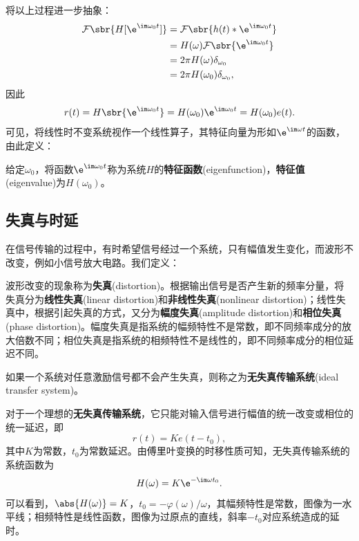 将以上过程进一步抽象：
\begin{align}
    \mathcal{F}\sbr{H[\e^{\im\omega_0 t}]}&=\mathcal{F}\sbr{h(t)*\e^{\im\omega_0 t}}\nonumber\\
    &=H(\omega)\mathcal{F}\sbr{\e^{\im\omega_0 t}}\nonumber\\
    &=2\pi H(\omega)\delta_{\omega_0}\nonumber\\
    &=2\pi H(\omega_0)\delta_{\omega_0},
\end{align}
因此
\begin{equation}
    r(t)=H\sbr{\e^{\im\omega_0 t}}=H(\omega_0)\e^{\im\omega_0 t}=H(\omega_0)e(t).
\end{equation}
可见，将线性时不变系统视作一个线性算子，其特征向量为形如$\e^{\im\omega t}$的函数，由此定义：
\begin{definition}[特征函数]\label{def:eigenfunction}
    给定$\omega_0$，将函数$\e^{\im\omega_0 t}$称为系统$H$的\textbf{特征函数}(eigenfunction)，\textbf{特征值}(eigenvalue)为$H(\omega_0)$。
\end{definition}

\subsection{失真与时延}\label{sub:distortion}

在信号传输的过程中，有时希望信号经过一个系统，只有幅值发生变化，而波形不改变，例如小信号放大电路。我们定义：
\begin{definition}[失真]
    波形改变的现象称为\textbf{失真}(distortion)。根据输出信号是否产生新的频率分量，将失真分为\textbf{线性失真}(linear distortion)和\textbf{非线性失真}(nonlinear distortion)；线性失真中，根据引起失真的方式，又分为\textbf{幅度失真}(amplitude distortion)和\textbf{相位失真}(phase distortion)。幅度失真是指系统的幅频特性不是常数，即不同频率成分的放大倍数不同；相位失真是指系统的相频特性不是线性的，即不同频率成分的相位延迟不同。
\end{definition}
\begin{definition}[无失真传输系统]
    如果一个系统对任意激励信号都不会产生失真，则称之为\textbf{无失真传输系统}(ideal transfer system)。
\end{definition}

对于一个理想的\textbf{无失真传输系统}，它只能对输入信号进行幅值的统一改变或相位的统一延迟，即
\begin{equation}
    r(t)=Ke(t-t_0),
\end{equation}
其中$K$为常数，$t_0$为常数延迟。由傅里叶变换的时移性质可知，无失真传输系统的系统函数为
\begin{equation}
    H(\omega)=K\e^{-\im\omega t_0}.
\end{equation}
可以看到，$\abs{H(\omega)}=K$，$t_0=-\varphi(\omega)/\omega$，其幅频特性是常数，图像为一水平线；相频特性是线性函数，图像为过原点的直线，斜率$-t_0$对应系统造成的延时。

